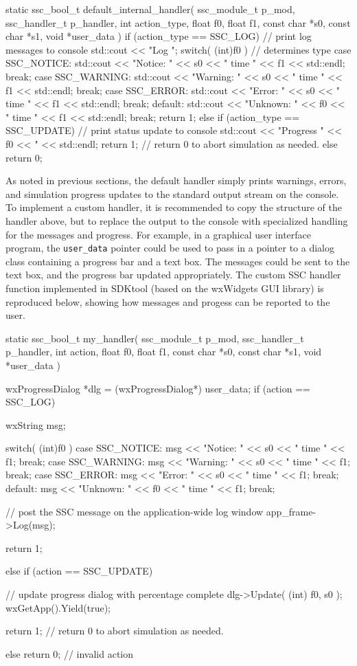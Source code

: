 \documentclass{scrartcl} %
\begin{document}
\begin{verbatimtab}[4]
static ssc_bool_t default_internal_handler( ssc_module_t p_mod, 
     ssc_handler_t p_handler,
	 int action_type, 
     float f0, float f1, 
	 const char *s0, const char *s1,
	 void *user_data )
{
	if (action_type == SSC_LOG)
	{
		// print log messages to console
		std::cout << "Log ";
		switch( (int)f0 ) // determines type
		{
		case SSC_NOTICE: 
			std::cout << "Notice: " << s0 << " time " << f1 << std::endl; 
			break;
		case SSC_WARNING: 
			std::cout << "Warning: " << s0 << " time " << f1 << std::endl; 
			break;
		case SSC_ERROR: 
			std::cout << "Error: " << s0 << " time " << f1 << std::endl; 
			break;
		default: 
			std::cout << "Unknown: " << f0 << " time " << f1 << std::endl; 
			break;
		}
		return 1;
	}
	else if (action_type == SSC_UPDATE)
	{
		// print status update to console
		std::cout << "Progress " << f0 << "%
             << std::endl;
		return 1; // return 0 to abort simulation as needed.
	}
	else
		return 0;
}
\end{verbatimtab}

As noted in previous sections, the default handler simply prints warnings, errors, and simulation progress updates to the standard output stream on the console.  To implement a custom handler, it is recommended to copy the structure of the handler above, but to replace the output to the console with specialized handling for the messages and progress.  For example, in a graphical user interface program, the \texttt{user\_data} pointer could be used to pass in a pointer to a dialog class containing a progress bar and a text box.  The messages could be sent to the text box, and the progress bar updated appropriately.  The custom SSC handler function implemented in SDKtool (based on the wxWidgets GUI library) is reproduced below, showing how messages and progess can be reported to the user.

\begin{verbatimtab}[4]
static ssc_bool_t my_handler( ssc_module_t p_mod, ssc_handler_t p_handler, 
     int action, float f0, float f1, const char *s0, const char *s1, 
     void *user_data )
{
	wxProgressDialog *dlg = (wxProgressDialog*) user_data;
	if (action == SSC_LOG)
	{
		wxString msg;

		switch( (int)f0 )
		{
		case SSC_NOTICE: msg << "Notice: " << s0 << " time " << f1; break;
		case SSC_WARNING: msg << "Warning: " << s0 << " time " << f1; break;
		case SSC_ERROR: msg << "Error: " << s0 << " time " << f1; break;
		default: msg << "Unknown: " << f0 << " time " << f1; break;
		}

		// post the SSC message on the application-wide log window 
		app_frame->Log(msg);

		return 1;
	}
	else if (action == SSC_UPDATE)
	{
 		// update progress dialog with percentage complete
		dlg->Update( (int) f0, s0 );
		wxGetApp().Yield(true);

		return 1; // return 0 to abort simulation as needed.
	}
	else
		return 0; // invalid action
}
\end{verbatimtab}
\end{document}
